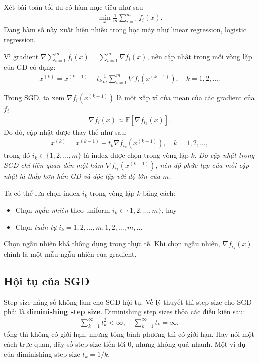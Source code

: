 \documentclass{book}
\begin{document}
Xét bài toán tối ưu có hàm mục tiêu như sau
\begin{align*}
\min_x \frac{1}{m}\sum_{i=1}^m f_i (x).
\end{align*}
Dạng hàm số này xuất hiện nhiều trong học máy như linear regression, logistic regression.

Vì gradient $\nabla \sum_{i=1}^m f_i(x) =  \sum_{i=1}^m \nabla f_i(x)$, nên cập nhật trong mỗi vòng lặp của GD có dạng:
\begin{align*}
x^{(k)} = x^{(k-1)} - t_k  \frac{1}{m}\sum_{i=1}^m \nabla f_i (x^{(k-1)}), \quad k=1,2,\ldots.
\end{align*}

Trong SGD, ta xem $\nabla f_i (x^{(k-1)})$ là một xấp xỉ của mean của các gradient của $f_i$
\begin{align*}
\nabla f_i(x) \approx \mathbb{E}[\nabla f_{i_k} (x)].
\end{align*}
Do đó, cập nhật được thay thế như sau:
\begin{align}
x^{(k)} = x^{(k-1)} - t_k  \nabla f_{i_k} (x^{(k-1)}), \quad k=1,2,\ldots,
\label{eq:update_sgd}
\end{align}
trong đó $i_k \in \{1, 2, \ldots, m\}$ là index được chọn trong vòng lặp $k$.
\emph{Do cập nhật trong SGD chỉ liên quan đến một hàm $\nabla f_{i_k} (x^{(k-1)})$, nên độ phức tạp của mỗi cập nhật là thấp hơn hẳn GD và độc lập với độ lớn của $m$.} 

Ta có thể lựa chọn index $i_k$ trong vòng lặp $k$ bằng cách:
\begin{itemize}
\item Chọn \emph{ngẫu nhiên} theo uniform $i_k \in \{1, 2, \ldots, m\}$, hay
\item Chọn \emph{tuần tự} $i_k = 1, 2, \ldots, m, 1, 2, \ldots, m, \ldots$
\end{itemize}
Chọn ngẫu nhiên khá thông dụng trong thực tế. Khi chọn ngẫu nhiên, $\nabla f_{i_k} (x)$ chính là một mẫu ngẫu nhiên của gradient.

\subsection{Hội tụ của SGD}
Step size hằng số không làm cho SGD hội tụ. Về lý thuyết thì step size cho SGD phải là \textbf{diminishing step size}.
Diminishing step sizes thỏa các điều kiện sau:
\begin{align*}
\sum_{k=1}^{\infty} t_k^2 < \infty, \quad \sum_{k=1}^{\infty} t_k =\infty,
\end{align*}
tổng thì không có giới hạn, nhưng tổng bình phương thì có giới hạn. Hay nói một cách trực quan, dãy số step size tiến tới 0, nhưng không quá nhanh.  
Một ví dụ của diminishing step size $t_k = 1/k$.
\end{document}
